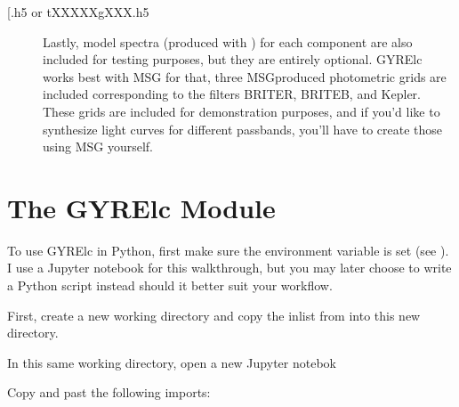 \documentclass[letterpaper,10pt,english]{sphinxmanual}
\begin{document}
\begin{description}
\item[{{[}\sphinxstyleemphasis{filter}{]}.h5 or tXXXXXgXXX.h5}] \leavevmode
\sphinxAtStartPar
Lastly, model spectra (produced with ) for each component are also included for testing purposes, but they are entirely optional. GYRE\sphinxhyphen{}lc works best with MSG\textendash{} for that, three MSG\sphinxhyphen{}produced photometric grids are included corresponding to the filters BRITE\sphinxhyphen{}R, BRITE\sphinxhyphen{}B, and Kepler. These grids are included for demonstration purposes, and if you’d like to synthesize light curves for different passbands, you’ll have to create those using MSG yourself.

\end{description}


\section{The GYRE\sphinxhyphen{}lc Module}
\label{\detokenize{user-guide/python-walkthrough:the-gyre-lc-module}}
\sphinxAtStartPar
To use GYRE\sphinxhyphen{}lc in Python, first make sure the  environment variable is set (see ). I use a Jupyter notebook for this walkthrough, but you may later choose to write a Python script instead should it better suit your workflow.

\sphinxAtStartPar
First, create a new working directory and copy the  inlist from  into this new directory.

\sphinxAtStartPar
In this same working directory, open a new Jupyter notebok

\sphinxAtStartPar
Copy and past the following imports:
\end{document}
